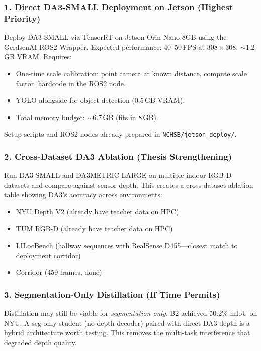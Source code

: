 \documentclass[11pt,a4paper]{article}
\begin{document}
\subsubsection{1. Direct DA3-SMALL Deployment on Jetson (Highest Priority)}

Deploy DA3-SMALL via TensorRT on Jetson Orin Nano 8GB using the
GerdsenAI ROS2 Wrapper. Expected performance: 40--50\,FPS at
$308 \times 308$, $\sim$1.2\,GB VRAM. Requires:
\begin{itemize}[nosep]
  \item One-time scale calibration: point camera at known distance,
    compute scale factor, hardcode in the ROS2 node.
  \item YOLO alongside for object detection (0.5\,GB VRAM).
  \item Total memory budget: $\sim$6.7\,GB (fits in 8\,GB).
\end{itemize}
Setup scripts and ROS2 nodes already prepared in
\texttt{NCHSB/jetson\_deploy/}.

\subsubsection{2. Cross-Dataset DA3 Ablation (Thesis Strengthening)}

Run DA3-SMALL and DA3METRIC-LARGE on multiple indoor RGB-D datasets
and compare against sensor depth. This creates a cross-dataset ablation
table showing DA3's accuracy across environments:
\begin{itemize}[nosep]
  \item NYU Depth V2 (already have teacher data on HPC)
  \item TUM RGB-D (already have teacher data on HPC)
  \item LILocBench (hallway sequences with RealSense D455---closest
    match to deployment corridor)
  \item Corridor (459 frames, done)
\end{itemize}

\subsubsection{3. Segmentation-Only Distillation (If Time Permits)}

Distillation may still be viable for \emph{segmentation only}. B2
achieved 50.2\% mIoU on NYU. A seg-only student (no depth decoder)
paired with direct DA3 depth is a hybrid architecture worth testing.
This removes the multi-task interference that degraded depth quality.
\end{document}
